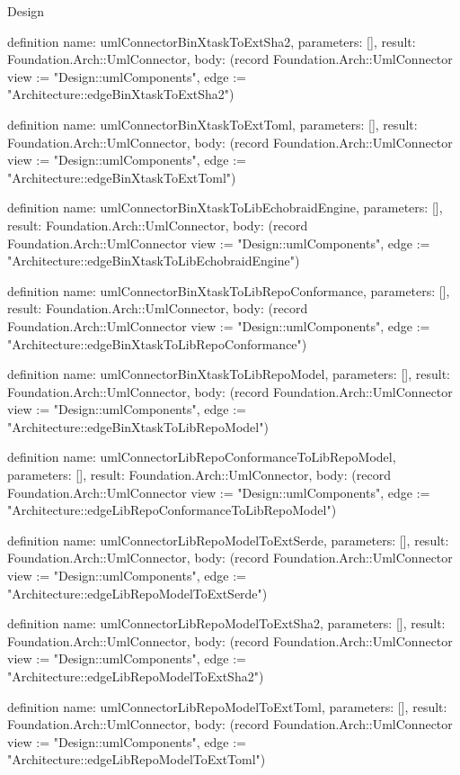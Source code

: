 \begin{lexlean}{Design}
\begin{semanticmodule}
definition{
  name: umlConnectorBinXtaskToExtSha2,
  parameters: [],
  result: Foundation.Arch::UmlConnector,
  body: (record Foundation.Arch::UmlConnector {view := "Design::umlComponents", edge := "Architecture::edgeBinXtaskToExtSha2"})
}

definition{
  name: umlConnectorBinXtaskToExtToml,
  parameters: [],
  result: Foundation.Arch::UmlConnector,
  body: (record Foundation.Arch::UmlConnector {view := "Design::umlComponents", edge := "Architecture::edgeBinXtaskToExtToml"})
}

definition{
  name: umlConnectorBinXtaskToLibEchobraidEngine,
  parameters: [],
  result: Foundation.Arch::UmlConnector,
  body: (record Foundation.Arch::UmlConnector {view := "Design::umlComponents", edge := "Architecture::edgeBinXtaskToLibEchobraidEngine"})
}

definition{
  name: umlConnectorBinXtaskToLibRepoConformance,
  parameters: [],
  result: Foundation.Arch::UmlConnector,
  body: (record Foundation.Arch::UmlConnector {view := "Design::umlComponents", edge := "Architecture::edgeBinXtaskToLibRepoConformance"})
}

definition{
  name: umlConnectorBinXtaskToLibRepoModel,
  parameters: [],
  result: Foundation.Arch::UmlConnector,
  body: (record Foundation.Arch::UmlConnector {view := "Design::umlComponents", edge := "Architecture::edgeBinXtaskToLibRepoModel"})
}

definition{
  name: umlConnectorLibRepoConformanceToLibRepoModel,
  parameters: [],
  result: Foundation.Arch::UmlConnector,
  body: (record Foundation.Arch::UmlConnector {view := "Design::umlComponents", edge := "Architecture::edgeLibRepoConformanceToLibRepoModel"})
}

definition{
  name: umlConnectorLibRepoModelToExtSerde,
  parameters: [],
  result: Foundation.Arch::UmlConnector,
  body: (record Foundation.Arch::UmlConnector {view := "Design::umlComponents", edge := "Architecture::edgeLibRepoModelToExtSerde"})
}

definition{
  name: umlConnectorLibRepoModelToExtSha2,
  parameters: [],
  result: Foundation.Arch::UmlConnector,
  body: (record Foundation.Arch::UmlConnector {view := "Design::umlComponents", edge := "Architecture::edgeLibRepoModelToExtSha2"})
}

definition{
  name: umlConnectorLibRepoModelToExtToml,
  parameters: [],
  result: Foundation.Arch::UmlConnector,
  body: (record Foundation.Arch::UmlConnector {view := "Design::umlComponents", edge := "Architecture::edgeLibRepoModelToExtToml"})
}


\end{semanticmodule}
\end{lexlean}
